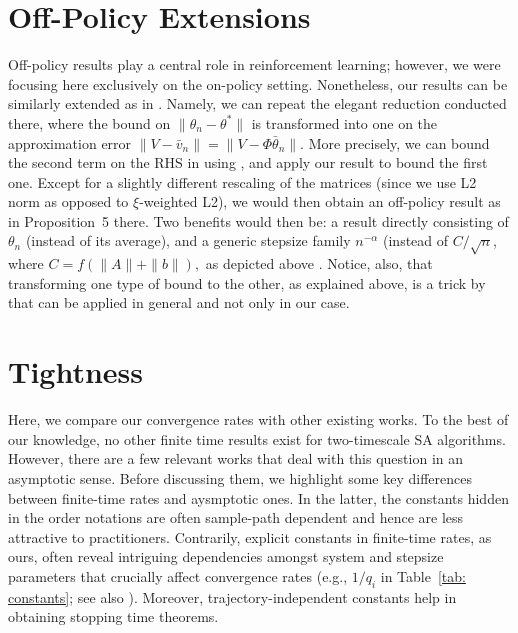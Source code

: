 \documentclass[usenames,dvipsnames,final,12pt]{colt2018} %
\begin{document}
\newpage

\appendix

\section{Off-Policy Extensions}
\label{sec: off policy}
Off-policy results play a central role in reinforcement learning; however, we were focusing here exclusively on the on-policy setting. Nonetheless, our results can be similarly extended as in \citep{liu2015finite}. Namely, we can repeat the elegant reduction conducted there, where the bound on $\|\theta_n-\theta^*\|$ is transformed into one on the approximation error  $\|V-\bar{v}_n\|=\|V-\Phi\bar{\theta}_n\|.$ More precisely, we can bound the second term on the RHS in \citep[Appendix~B, (42)]{liu2015finite} using \citep[Theorem~2]{kolter2011fixed}, and apply our result to bound the first one. Except for a slightly different rescaling of the matrices (since we use L2 norm as opposed to $\xi$-weighted L2), we would then obtain an off-policy result as in Proposition~5 there. Two benefits would then be: a result directly consisting of $\theta_n$ (instead of its average), and a generic stepsize family $n^{-\alpha}$ (instead of $C/\sqrt{n}$, where $C=f(\|A\|+\|b\|),$ as depicted above \citep[Appendix~B, (40)]{liu2015finite}. Notice, also, that transforming one type of bound to the other, as explained above, is a trick by \citep{liu2015finite} that can be applied in general and not only in our case.

\section{Tightness}
\label{sec: tightness}
Here, we compare our convergence rates with other existing works. To the best of our knowledge, no other finite time results exist for two-timescale SA algorithms. However, there are a few relevant works that deal with this question in an asymptotic sense. Before discussing them, we highlight some key differences between finite-time rates and aysmptotic ones. In the latter, the constants hidden in the order notations are often sample-path dependent and hence are less attractive to practitioners. Contrarily, explicit constants in finite-time rates, as ours, often reveal intriguing dependencies amongst system and stepsize parameters that crucially affect convergence rates (e.g., $1/q_i$ in Table~\ref{tab: constants}; see also \citep[Section~6]{dalal2018finite}). Moreover, trajectory-independent constants help in obtaining stopping time theorems.
\end{document}

